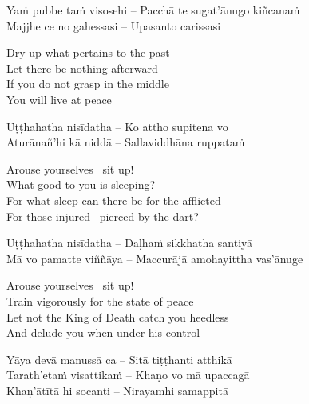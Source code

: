 \suttaRef{[Dhp 91]}

\begin{verses}
  Yaṁ pubbe taṁ visosehi – Pacchā te sugat'ānugo kiñcanaṁ\\
  Majjhe ce no gahessasi – Upasanto carissasi
\end{verses}

\begin{english-verses}
  Dry up what pertains to the past\\
  Let there be nothing afterward\\
  If you do not grasp in the middle\\
  You will live at peace
\end{english-verses}

\suttaRef{[Snp 949]}

\begin{verses}
  Uṭṭhahatha nisīdatha – Ko attho supitena vo\\
  Āturānañ'hi kā niddā – Sallaviddhāna ruppataṁ
\end{verses}

\begin{english-verses}
  Arouse yourselves \breathmark\ sit up!\\
  What good to you is sleeping?\\
  For what sleep can there be for the afflicted\\
  For those injured \breathmark\ pierced by the dart?
\end{english-verses}

\begin{verses}
  Uṭṭhahatha nisīdatha – Daḷhaṁ sikkhatha santiyā\\
  Mā vo pamatte viññāya – Maccurājā amohayittha vas'ānuge
\end{verses}

\begin{english-verses}
  Arouse yourselves \breathmark\ sit up!\\
  Train vigorously for the state of peace\\
  Let not the King of Death catch you heedless\\
  And delude you when under his control
\end{english-verses}

\begin{verses}
  Yāya devā manussā ca – Sitā tiṭṭhanti atthikā\\
  Tarath'etaṁ visattikaṁ – Khaṇo vo mā upaccagā\\
  Khaṇ'ātītā hi socanti – Nirayamhi samappitā
\end{verses}

